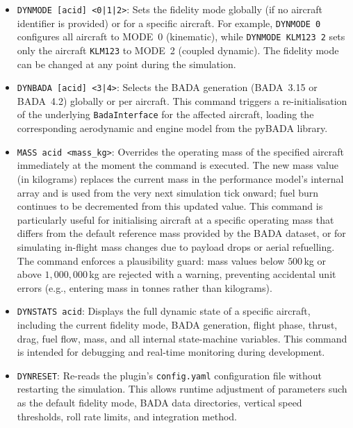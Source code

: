 \begin{itemize}
    \item \texttt{DYNMODE [acid] <0|1|2>}: Sets the fidelity mode globally (if no aircraft identifier is provided) or for a specific aircraft. For example, \texttt{DYNMODE 0} configures all aircraft to MODE~0 (kinematic), while \texttt{DYNMODE KLM123 2} sets only the aircraft \texttt{KLM123} to MODE~2 (coupled dynamic). The fidelity mode can be changed at any point during the simulation.

    \item \texttt{DYNBADA [acid] <3|4>}: Selects the BADA generation (BADA~3.15 or BADA~4.2) globally or per aircraft. This command triggers a re-initialisation of the underlying \texttt{BadaInterface} for the affected aircraft, loading the corresponding aerodynamic and engine model from the pyBADA library.

    \item \texttt{MASS acid <mass\_kg>}: Overrides the operating mass of the specified aircraft immediately at the moment the command is executed. The new mass value (in kilograms) replaces the current mass in the performance model's internal array and is used from the very next simulation tick onward; fuel burn continues to be decremented from this updated value. This command is particularly useful for initialising aircraft at a specific operating mass that differs from the default reference mass provided by the BADA dataset, or for simulating in-flight mass changes due to payload drops or aerial refuelling. The command enforces a plausibility guard: mass values below $500$\,kg or above $1{,}000{,}000$\,kg are rejected with a warning, preventing accidental unit errors (e.g., entering mass in tonnes rather than kilograms).

    \item \texttt{DYNSTATS acid}: Displays the full dynamic state of a specific aircraft, including the current fidelity mode, BADA generation, flight phase, thrust, drag, fuel flow, mass, and all internal state-machine variables. This command is intended for debugging and real-time monitoring during development.

    \item \texttt{DYNRESET}: Re-reads the plugin's \texttt{config.yaml} configuration file without restarting the simulation. This allows runtime adjustment of parameters such as the default fidelity mode, BADA data directories, vertical speed thresholds, roll rate limits, and integration method.
\end{itemize}

